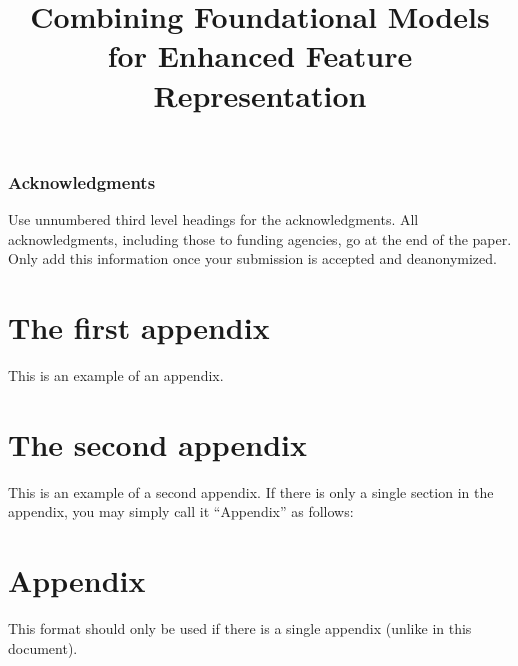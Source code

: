 \documentclass[10pt]{article} %
\title{Combining Foundational Models for Enhanced Feature Representation}
\begin{document}



\tableofcontents
















\subsubsection*{Acknowledgments}
\label{sec:ack}
Use unnumbered third level headings for the acknowledgments. All acknowledgments, including those to funding agencies, go at the end of the paper. Only add this information once your submission is accepted and deanonymized. 





\appendix

\section{The first appendix}
\label{sec:appendix1}
This is an example of an appendix. 


\section{The second appendix}
\label{sec:appendix2}
This is an example of a second appendix. If there is only a single section in the appendix, you may simply call it ``Appendix'' as follows:

\section*{Appendix}
This format should only be used if there is a single appendix (unlike in this document).
\end{document}
